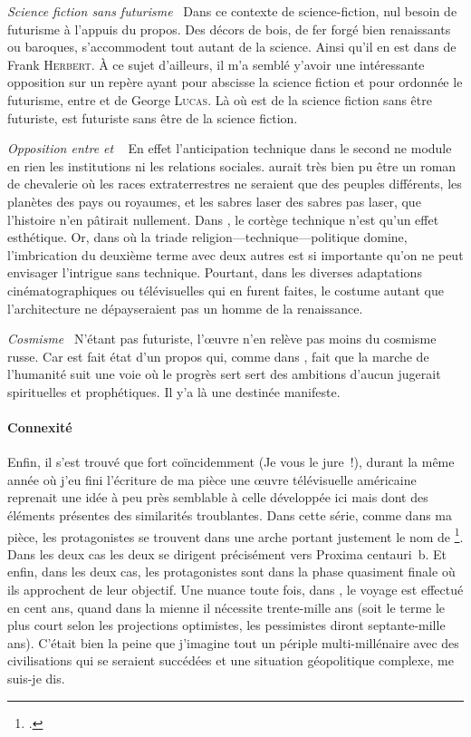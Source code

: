 {\em\normalsize Science fiction sans futurisme}~
Dans ce contexte de science-fiction, nul besoin de futurisme à l’appuis du propos. Des décors de bois, de fer forgé bien renaissants ou baroques, s’accommodent tout autant de la science. Ainsi qu’il en est dans  de Frank \textsc{Herbert}. À ce sujet d’ailleurs, il m’a semblé y’avoir une intéressante opposition sur un repère ayant pour abscisse la science fiction et pour ordonnée le futurisme, entre  et  de George \textsc{Lucas}. Là où  est de la science fiction sans être futuriste,  est futuriste sans être de la science fiction.

{\em\normalsize Opposition entre  et }~
En effet l’anticipation technique dans le second ne module en rien les institutions ni les relations sociales.  aurait très bien pu être un roman de chevalerie où les races extraterrestres ne seraient que des peuples différents, les planètes des pays ou royaumes, et les sabres laser des sabres pas laser, que l’histoire n’en pâtirait nullement. Dans , le cortège technique n’est qu’un effet esthétique.
Or, dans  où la triade religion—technique—politique domine, l’imbrication du deuxième terme avec deux autres est si importante qu’on ne peut envisager l’intrigue sans technique. Pourtant, dans les diverses adaptations cinématographiques ou télévisuelles qui en furent faites, le costume autant que l’architecture ne dépayseraient pas un homme de la renaissance.

{\em\normalsize Cosmisme}~
N’étant pas futuriste, l’œuvre n’en relève pas moins du cosmisme russe. Car est fait état d’un propos qui, comme dans , fait que la marche de l’humanité suit une voie où le progrès sert sert des ambitions d’aucun jugerait spirituelles et prophétiques. Il y’a là une destinée manifeste.

\paragraph{Connexité}
Enfin, il s’est trouvé que fort coïncidemment (Je vous le jure !), durant la même année où j’eu fini l’écriture de ma pièce une œuvre télévisuelle américaine reprenait une idée à peu près semblable à celle développée ici mais dont des éléments présentes des similarités troublantes. Dans cette série, comme dans ma pièce, les protagonistes se trouvent dans une arche portant justement le nom de \footcite{theArk}. Dans les deux cas les deux se dirigent précisément vers Proxima centauri~b. Et enfin, dans les deux cas, les protagonistes sont dans la phase quasiment finale où ils approchent de leur objectif. 
Une nuance toute fois, dans , le voyage est effectué en cent ans, quand dans la mienne il nécessite trente-mille ans (soit le terme le plus court selon les projections optimistes, les pessimistes diront septante-mille ans). C’était bien la peine que j’imagine tout un périple multi-millénaire avec des civilisations qui se seraient succédées et une situation géopolitique complexe, me suis-je dis.



